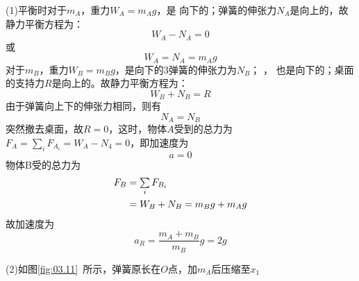 \solution (1)平衡时对于$ m_A $，重力$ W _ { A } = m _ { A } g $，是
向下的；弹簧的伸张力$ N _ { A } $是向上的，故静力平衡方程为：\vspace{-0.5em}
\begin{equation*}
  W _ { A } - N _ { A } = 0
\end{equation*}
或\vspace{-1.56em}
\begin{equation*}
  W _ { A } = N _ { A } = m _ { A } g
\end{equation*}
对于$ m_B $，重力$ W _ { B } = m _ { B } g $，是向下的3弹簧的伸张力为$ N _ { B } $； ，
也是向下的；桌面的支持力$ R $是向上的。故静力平衡方程为：
\begin{equation*}
  W _ { B } + N _ { B } = R
\end{equation*}
由于弹簧向上下的伸张力相同，则有
\begin{equation*}
  N _ { A } = N _ { B }
\end{equation*}
突然撤去桌面，故$  R = 0  $，这时，物体$ A $受到的总力为$  F _ { A } =
  \sum _ i F _ { A _ i } = W _ { A } - N _ { 4 } = 0  $，即加速度为
\begin{equation*}
  a = 0
\end{equation*}
物体B受的总力为
\begin{align*}
  F _ { B } & = \textstyle\sum\limits _ i F _ { B _ i }                            \\
            & = W _ { B } + N _ { B } = m _ { B } g + m _ { A } g
\end{align*}
故加速度为\vspace{-1.2em}
\begin{equation*}
  a _ { R } = \frac { m _ { A } + m _ { B } } { m _ { B } } g = 2 g
\end{equation*}

(2)如图\ref{fig:03.11}~所示，弹簧原长在$ O $点，加$ m_{A} $后压缩至$ x_{1} $

